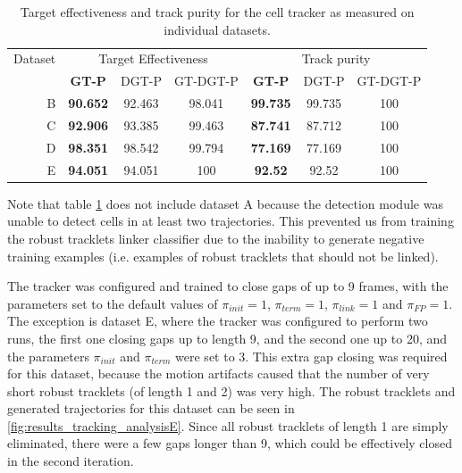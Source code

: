		\begin{table}[h]
			\centering
			\begin{tabular}{r*{3}{c}*{3}{c}}
				Dataset & \multicolumn{3}{c}{Target Effectiveness} &  \multicolumn{3}{c}{Track purity}   \\
				        &  \textbf{GT-P}  & DGT-P  &   GT-DGT-P    &  \textbf{GT-P}  & DGT-P  & GT-DGT-P \\
			\hline
				      B & \textbf{90.652} & 92.463 &    98.041     & \textbf{99.735} & 99.735 &   100    \\
				      C & \textbf{92.906} & 93.385 &    99.463     & \textbf{87.741} & 87.712 &   100    \\
				      D & \textbf{98.351} & 98.542 &    99.794     & \textbf{77.169} & 77.169 &   100    \\
				      E & \textbf{94.051} & 94.051 &      100      & \textbf{ 92.52} & 92.52  &   100
			\end{tabular} 
			\caption{Target effectiveness and track purity for the cell tracker as measured on individual datasets.}
			\label{tab:results_tracker_individual}
		\end{table}
		
		Note that table \cref{tab:results_tracker_individual} does not include dataset A because the detection module was unable to detect cells in at least two trajectories. This prevented us from training the robust tracklets linker classifier due to the inability to generate negative training examples (i.e. examples of robust tracklets that should not be linked).
		
		The tracker was configured and trained to close gaps of up to 9 frames, with the parameters set to the default values of $\pi_{init}=1$, $\pi_{term}=1$, $\pi_{link}=1$ and $\pi_{FP}=1$. The exception is dataset E, where the tracker was configured to perform two runs, the first one closing gaps up to length 9, and the second one up to 20, and the parameters $\pi_{init}$ and $\pi_{term}$ were set to 3. This extra gap closing was required for this dataset, because the motion artifacts caused that the number of very short robust tracklets (of length 1 and 2) was very high. The robust tracklets and generated trajectories for this dataset can be seen in \cref{fig:results_tracking_analysisE}. Since all robust tracklets of length 1 are simply eliminated, there were a few gaps longer than 9, which could be effectively closed in the second iteration.
		
